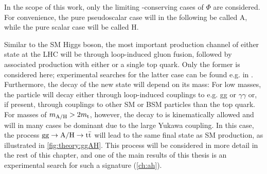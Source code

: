 In the scope of this work, only the limiting \CP-conserving cases of $\Phi$ are considered. For convenience, the pure pseudoscalar case will in the following be called A, while the pure scalar case will be called H.

Similar to the SM Higgs boson, the most important production channel of either state at the LHC will be through loop-induced gluon fusion, followed by associated production with either \ttbar or a single top quark. Only the former is considered here; experimental searches for the latter case can be found e.g. in . Furthermore, the decay of the new state will depend on its mass: For low masses, the particle will decay either through loop-induced couplings to e.g. gg or $\gamma \gamma$ or, if present, through couplings to other SM or BSM particles than the top quark. For masses of $m_{\mathrm{A/H}} > 2 m_{\mathrm{t}}$, however, the decay to \ttbar is kinematically allowed and will in many cases be dominant due to the large Yukawa coupling. In this case, the process $\mathrm{gg \rightarrow A/H \rightarrow \mathrm{t \bar{t}}}$ will lead to the same final state as SM \ttbar production, as illustrated in \cref{fig:theory:ggAH}. This process will be considered in more detail in the rest of this chapter, and one of the main results of this thesis is an experimental search for such a signature (\cref{ch:ah}).



